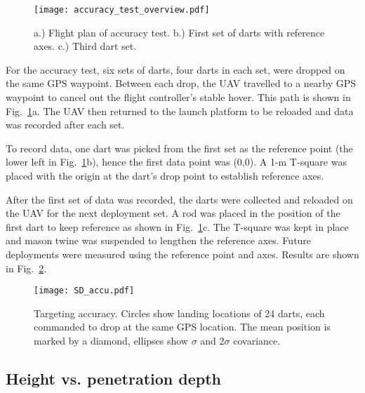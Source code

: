 

\begin{figure} \centering
  {\texttt{[image: accuracy\_test\_overview.pdf]}}
 \caption{a.) Flight plan of accuracy test. b.) First set of darts with reference axes. c.) Third dart set. } 
 \label{fig:Accu_test_darts}
\end{figure}

For the accuracy test, six sets of darts, four darts in each set, were dropped on the same GPS waypoint. Between each drop, the UAV travelled to a nearby GPS waypoint to cancel out the flight controller's stable hover.  This path is shown in Fig.~\ref{fig:Accu_test_darts}a. The UAV then returned to the launch platform to be reloaded and data was recorded after each set.

To record data, one dart was picked from the first set as the reference point (the lower left in Fig.~\ref{fig:Accu_test_darts}b), hence the first data point was (0,0). A 1-m T-square was placed with the origin at the dart's drop point to establish reference axes.

After the first set of data was recorded, the darts were collected and reloaded on the UAV for the next deployment set.
 A rod was placed in the position of the first dart to keep reference as shown in Fig.~\ref{fig:Accu_test_darts}c. 
 The T-square was kept in place and mason twine was suspended to lengthen the reference axes. 
 Future deployments were measured  using the reference point and axes. 
  Results are shown in Fig.~\ref{fig:SD_accu.pdf}.


\begin{figure} \centering
  {\texttt{[image: SD\_accu.pdf]}}
 \caption{Targeting accuracy.  Circles show landing locations of 24 darts, each commanded to drop at the same GPS location. The mean position is marked by a diamond, ellipses show  $\sigma$ and 2$\sigma$ covariance.
 \label{fig:SD_accu.pdf}}
\end{figure}


\subsection{Height vs. penetration depth}

